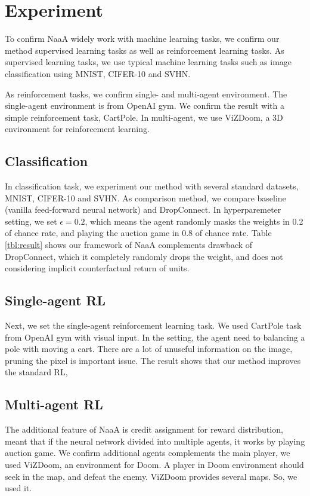 \section{Experiment}
To confirm NaaA widely work with machine learning tasks,
we confirm our method supervised learning tasks as well as reinforcement learning tasks.
As supervised learning tasks, we use typical machine learning tasks such as image classification
using MNIST, CIFER-10 and SVHN.

As reinforcement tasks, we confirm single- and multi-agent environment.
The single-agent environment is from OpenAI gym.
We confirm the result with a simple reinforcement task, CartPole.
In multi-agent, we use ViZDoom, a 3D environment for reinforcement learning.

\subsection{Classification}
In classification task, we experiment our method with several standard datasets, MNIST, CIFER-10 and SVHN.
As comparison method, we compare baseline (vanilla feed-forward neural network) and DropConnect.
In hyperparemeter setting, we set $\epsilon = 0.2$, which means the agent randomly masks the weights in 0.2 of chance rate, 
and playing the auction game in 0.8 of chance rate.
Table \ref{tbl:result} shows our framework of NaaA complements drawback of DropConnect, 
which it completely randomly drops the weight, and does not considering implicit counterfactual return of units.

\subsection{Single-agent RL}
Next, we set the single-agent reinforcement learning task.
We used CartPole task from OpenAI gym with visual input.
In the setting, the agent need to balancing a pole with moving a cart.
There are a lot of unuseful information on the image, pruning the pixel is important issue.
The result shows that our method improves the standard RL,

\subsection{Multi-agent RL}
The additional feature of NaaA is credit assignment for reward distribution, 
meant that if the neural network divided into multiple agents, it works by playing auction game.
We confirm additional agents complements the main player, we used ViZDoom, an environment for Doom.
A player in Doom environment should seek in the map, and defeat the enemy.
ViZDoom provides several maps. So, we used it.

